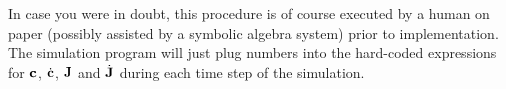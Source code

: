 In case you were in doubt, this procedure is of course executed by a human on paper
(possibly assisted by a symbolic algebra system) prior to
implementation. The simulation program will just plug numbers into the hard-coded expressions
for $\ve{c}$, $\dot{\ve{c}}$, $\m{J}$ and $\dot{\m{J}}$ during each time step
of the simulation.
